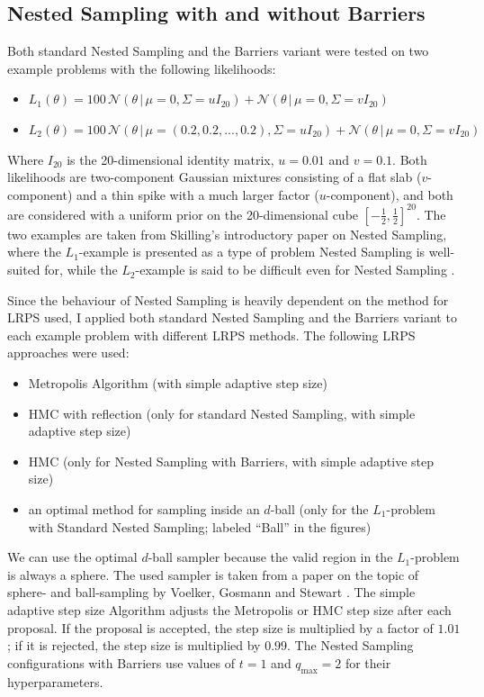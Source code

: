 \documentclass[12pt, a4paper]{report}
\begin{document}
\subsection{Nested Sampling with and without Barriers}
Both standard Nested Sampling and the Barriers variant were tested on two example problems with the following likelihoods:
\begin{itemize}
    \item $L_1(\theta) = 100 \, \mathcal{N}(\theta \,|\, \mu=0, \Sigma= u I_{20}) + \mathcal{N}(\theta \,|\, \mu=0, \Sigma= v I_{20})$
    \item $L_2(\theta) = 100 \, \mathcal{N}(\theta \,|\, \mu=(0.2, 0.2, ..., 0.2), \Sigma= u I_{20}) + \mathcal{N}(\theta \,|\, \mu=0, \Sigma= v I_{20})$
\end{itemize}
Where $I_{20}$ is the 20-dimensional identity matrix, $u = 0.01$ and $v = 0.1$.
Both likelihoods are two-component Gaussian mixtures consisting of a flat slab ($v$-component) and a thin spike with a much larger factor ($u$-component), and both are considered with a uniform prior on the 20-dimensional cube $[-\frac{1}{2}, \frac{1}{2}]^{20}$.
The two examples are taken from Skilling's introductory paper on Nested Sampling, where the $L_1$-example is presented as a type of problem Nested Sampling is well-suited for, while the $L_2$-example is said to be difficult even for Nested Sampling \cite[21]{skilling}.

Since the behaviour of Nested Sampling is heavily dependent on the method for LRPS used, I applied both standard Nested Sampling and the Barriers variant to each example problem with different LRPS methods.
The following LRPS approaches were used:
\begin{itemize}
    \item Metropolis Algorithm (with simple adaptive step size)
    \item HMC with reflection (only for standard Nested Sampling, with simple adaptive step size)
    \item HMC (only for Nested Sampling with Barriers, with simple adaptive step size)
    \item an optimal method for sampling inside an $d$-ball (only for the $L_1$-problem with Standard Nested Sampling; labeled ``Ball'' in the figures)  
\end{itemize}
We can use the optimal $d$-ball sampler because the valid region in the $L_1$-problem is always a sphere.
The used sampler is taken from a paper on the topic of sphere- and ball-sampling by Voelker, Gosmann and Stewart \cite[2]{sphere_sampling}.
The simple adaptive step size Algorithm adjusts the Metropolis or HMC step size after each proposal.
If the proposal is accepted, the step size is multiplied by a factor of $1.01$; if it is rejected, the step size is multiplied by $0.99$.
The Nested Sampling configurations with Barriers use values of $t=1$ and $q_{\textrm{max}} = 2$ for their hyperparameters.
\end{document}
